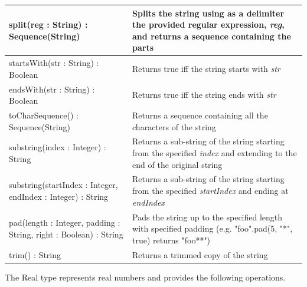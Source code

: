 \begin{longtable} {|p{5.5cm}|p{6.5cm}|}
			split(reg : String) : Sequence(String) & Splits the string using as a delimiter the provided regular expression, \emph{reg}, and returns a sequence containing the parts\\\hline
			
			startsWith(str : String) : Boolean & Returns true iff the string starts with \emph{str}\\\hline
			
			endsWith(str : String) : Boolean & Returns true iff the string ends with \emph{str}\\\hline
			
			toCharSequence() : Sequence(String) & Returns a sequence containing all the characters of the string\\\hline
			
			substring(index : Integer) : String & Returns a sub-string of the string starting from the specified \emph{index} and extending to the end of the original string\\\hline
			
			substring(startIndex : Integer, endIndex : Integer) : String & Returns a sub-string of the string starting from the specified \emph{startIndex} and ending at \emph{endIndex} \\\hline
			
			pad(length : Integer, padding : String, right : Boolean) : String & Pads the string up to the specified length with specified padding (e.g. "foo".pad(5, "*", true) returns "foo**") \\\hline
			
			trim() : String & Returns a trimmed copy of the string \\\hline			
			
\end{longtable}

The Real type represents real numbers and provides the following operations.

